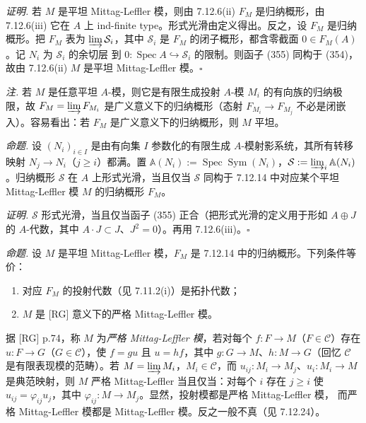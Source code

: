 \emph{证明.} 若 $M$ 是平坦 Mittag-Leffler 模，则由 7.12.6(ii) $F_M$ 是归纳概形，由 7.12.6(iii) 它在 $A$ 上 ind-finite type。形式光滑由定义得出。反之，设 $F_M$ 是归纳概形。把 $F_M$ 表为 $\varinjlim\mathcal{S}_i$，其中 $\mathcal{S}_i$ 是 $F_M$ 的闭子概形，都含零截面 $0\in F_M(A)$。记 $N_i$ 为 $\mathcal{S}_i$ 的余切层%
%
到 $0:\operatorname{Spec}A\hookrightarrow\mathcal{S}_i$ 的限制。则函子 (355) 同构于 (354)，故由 7.12.6(ii) $M$ 是平坦 Mittag-Leffler 模。\hfill$\square$

\emph{注.} 若 $M$ 是任意平坦 $A$-模，则它是有限生成投射 $A$-模 $M_i$ 的有向族的归纳极限，故 $F_M=\varinjlim F_{M_i}$ 是广义意义下的归纳概形（态射 $F_{M_i}\to F_{M_j}$ 不必是闭嵌入）。容易看出：若 $F_M$ 是广义意义下的归纳概形，则 $M$ 平坦。

 \emph{命题.} 设 $(N_i)_{i\in I}$ 是由有向集 $I$ 参数化的有限生成 $A$-模射影系统，其所有转移映射 $N_j\to N_i$（$j\ge i$）都满。置 $\mathbb{A}(N_i):=\operatorname{Spec}\operatorname{Sym}(N_i)$，$\mathcal{S}:=\varinjlim_i\mathbb{A}(N_i)$。归纳概形 $\mathcal{S}$ 在 $A$ 上形式光滑，当且仅当 $\mathcal{S}$ 同构于 7.12.14 中对应某个平坦 Mittag-Leffler 模 $M$ 的归纳概形 $F_M$。

\emph{证明.} $\mathcal{S}$ 形式光滑，当且仅当函子 (355) 正合（把形式光滑的定义用于形如 $A\oplus J$ 的 $A$-代数，其中 $A\cdot J\subset J$、$J^2=0$）。再用 7.12.6(iii)。\hfill$\square$

 \emph{命题.} 设 $M$ 是平坦 Mittag-Leffler 模，$F_M$ 是 7.12.14 中的归纳概形。下列条件等价：
\begin{enumerate}[label=(\roman*),leftmargin=2.2em]
\item 对应 $F_M$ 的投射代数（见 7.11.2(i)）是拓扑代数；
\item $M$ 是 [RG] 意义下的严格 Mittag-Leffler 模。
\end{enumerate}

据 [RG] p.74，称 $M$ 为\emph{严格 Mittag-Leffler 模}，若对每个 $f:F\to M$（$F\in\mathcal{C}$）存在 $u:F\to G$（$G\in\mathcal{C}$），使 $f=gu$ 且 $u=hf$，其中 $g:G\to M$、$h:M\to G$（回忆 $\mathcal{C}$ 是有限表现模的范畴）。若 $M=\varinjlim M_i$，$M_i\in\mathcal{C}$，而 $u_{ij}:M_i\to M_j$、$u_i:M_i\to M$ 是典范映射，则 $M$ 严格 Mittag-Leffler 当且仅当：对每个 $i$ 存在 $j\ge i$ 使 $u_{ij}=\varphi_{ij}u_j$，其中 $\varphi_{ij}:M\to M_j$。显然，投射模都是严格 Mittag-Leffler 模，%
%
而严格 Mittag-Leffler 模都是 Mittag-Leffler 模。反之一般不真（见 7.12.24）。

